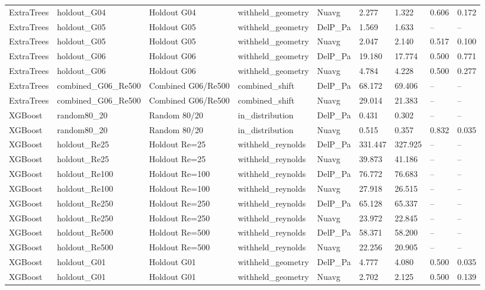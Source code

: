 \begin{tabular}{lllllllll}
ExtraTrees & holdout_G04 & Holdout G04 & withheld_geometry & Nuavg & 2.277 & 1.322 & 0.606 & 0.172 \\
ExtraTrees & holdout_G05 & Holdout G05 & withheld_geometry & DelP_Pa & 1.569 & 1.633 & -- & -- \\
ExtraTrees & holdout_G05 & Holdout G05 & withheld_geometry & Nuavg & 2.047 & 2.140 & 0.517 & 0.100 \\
ExtraTrees & holdout_G06 & Holdout G06 & withheld_geometry & DelP_Pa & 19.180 & 17.774 & 0.500 & 0.771 \\
ExtraTrees & holdout_G06 & Holdout G06 & withheld_geometry & Nuavg & 4.784 & 4.228 & 0.500 & 0.277 \\
ExtraTrees & combined_G06_Re500 & Combined G06/Re500 & combined_shift & DelP_Pa & 68.172 & 69.406 & -- & -- \\
ExtraTrees & combined_G06_Re500 & Combined G06/Re500 & combined_shift & Nuavg & 29.014 & 21.383 & -- & -- \\
XGBoost & random80_20 & Random 80/20 & in_distribution & DelP_Pa & 0.431 & 0.302 & -- & -- \\
XGBoost & random80_20 & Random 80/20 & in_distribution & Nuavg & 0.515 & 0.357 & 0.832 & 0.035 \\
XGBoost & holdout_Re25 & Holdout Re=25 & withheld_reynolds & DelP_Pa & 331.447 & 327.925 & -- & -- \\
XGBoost & holdout_Re25 & Holdout Re=25 & withheld_reynolds & Nuavg & 39.873 & 41.186 & -- & -- \\
XGBoost & holdout_Re100 & Holdout Re=100 & withheld_reynolds & DelP_Pa & 76.772 & 76.683 & -- & -- \\
XGBoost & holdout_Re100 & Holdout Re=100 & withheld_reynolds & Nuavg & 27.918 & 26.515 & -- & -- \\
XGBoost & holdout_Re250 & Holdout Re=250 & withheld_reynolds & DelP_Pa & 65.128 & 65.337 & -- & -- \\
XGBoost & holdout_Re250 & Holdout Re=250 & withheld_reynolds & Nuavg & 23.972 & 22.845 & -- & -- \\
XGBoost & holdout_Re500 & Holdout Re=500 & withheld_reynolds & DelP_Pa & 58.371 & 58.200 & -- & -- \\
XGBoost & holdout_Re500 & Holdout Re=500 & withheld_reynolds & Nuavg & 22.256 & 20.905 & -- & -- \\
XGBoost & holdout_G01 & Holdout G01 & withheld_geometry & DelP_Pa & 4.777 & 4.080 & 0.500 & 0.035 \\
XGBoost & holdout_G01 & Holdout G01 & withheld_geometry & Nuavg & 2.702 & 2.125 & 0.500 & 0.139 \\

\end{tabular}
